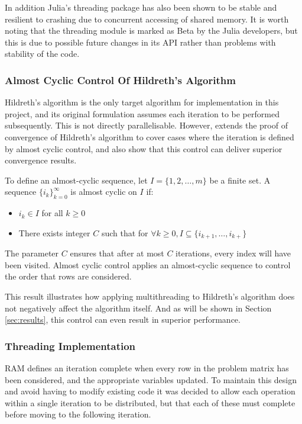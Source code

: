 In addition Julia's threading package has also been shown to be stable and resilient to crashing due to concurrent accessing of shared memory. It is worth noting that the threading module is marked as Beta by the Julia developers, but this is due to possible future changes in its API rather than problems with stability of the code.

\subsubsection{Almost Cyclic Control Of Hildreth's Algorithm}\label{subsub:hildreth_almost_cyc}

Hildreth's algorithm is the only target algorithm for implementation in this project, and its original formulation \cite{HildrethAPROCEDURE} assumes each iteration to be performed subsequently. This is not directly parallelisable. However, \cite{Lents1980EXTENSIONSPROGRAMMING} extends the proof of convergence of Hildreth's algorithm to cover cases where the iteration is defined by almost cyclic control, and also show that this control can deliver superior convergence results.

To define an almost-cyclic sequence, let $I=\{1,2,\ldots,m\}$ be a finite set. A sequence $\{i_k\}^\infty_{k=0}$ is almost cyclic on $I$ if:
\begin{itemize}
    \item $i_k \in I$ for all $k \geq 0$
    \item There exists integer $C$ such that for $\forall k \geq 0, I \subseteq \{i_{k+1},\ldots,i_{k+}\}$
\end{itemize}
The parameter $C$ ensures that after at most $C$ iterations, every index will have been visited. Almost cyclic control applies an almost-cyclic sequence to control the order that rows are considered. 

This result illustrates how applying multithreading to Hildreth's algorithm does not negatively affect the algorithm itself. And as will be shown in Section \ref{sec:results}, this control can even result in superior performance.

\subsubsection{Threading Implementation}

RAM defines an iteration complete when every row in the problem matrix has been considered, and the appropriate variables updated. To maintain this design and avoid having to modify existing code it was decided to allow each operation within a single iteration to be distributed, but that each of these must complete before moving to the following iteration.


